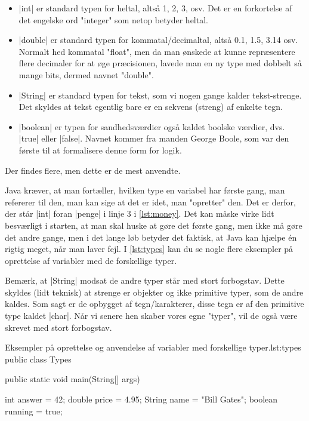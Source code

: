 {\begin{itemize}
	\item \JavaInline|int| er standard typen for heltal, altså 1, 2, 3, osv. Det er en forkortelse af det engelske ord "integer" som netop betyder heltal.
	\item \JavaInline|double| er standard typen for kommatal/decimaltal, altså 0.1, 1.5, 3.14 osv. Normalt hed kommatal "float", men da man ønskede at kunne repræsentere flere decimaler for at øge præcisionen, lavede man en ny type med dobbelt så mange bits, dermed navnet "double".
	\item \JavaInline|String| er standard typen for tekst, som vi nogen gange kalder tekst-strenge. Det skyldes at tekst egentlig bare er en sekvens (streng) af enkelte tegn.
	\item \JavaInline|boolean| er typen for sandhedsværdier også kaldet boolske værdier, dvs. \JavaInline|true| eller \JavaInline|false|. Navnet kommer fra manden George Boole, som var den første til at formalisere denne form for logik.
\end{itemize}

Der findes flere, men dette er de mest anvendte.

Java kræver, at man fortæller, hvilken type en variabel har første gang, man refererer til den, man kan sige at det er idet, man "opretter" den. Det er derfor, der står \JavaInline|int| foran \JavaInline|penge| i linje 3 i \autoref{lst:money}. Det kan måske virke lidt besværligt i starten, at man skal huske at gøre det første gang, men ikke må gøre det andre gange, men i det lange løb betyder det faktisk, at Java kan hjælpe én rigtig meget, når man laver fejl. I \autoref{lst:types} kan du se nogle flere eksempler på oprettelse af variabler med de forskellige typer.

\begin{remark}
	Bemærk, at \JavaInline|String| modsat de andre typer står med stort forbogstav. Dette skyldes (lidt teknisk) at strenge er objekter og ikke primitive typer, som de andre kaldes. Som sagt er de opbygget af tegn/karakterer, disse tegn er af den primitive type kaldet \JavaInline|char|. Når vi senere hen skaber vores egne "typer", vil de også være skrevet med stort forbogstav.
\end{remark}

\begin{JavaCode}{Eksempler på oprettelse og anvendelse af variabler med forskellige typer.}{lst:types}
	public class Types {
		public static void main(String[] args) {
			int answer = 42;
			double price = 4.95;
			String name = "Bill Gates";
			boolean running = true;
			
}}
\end{JavaCode}}
